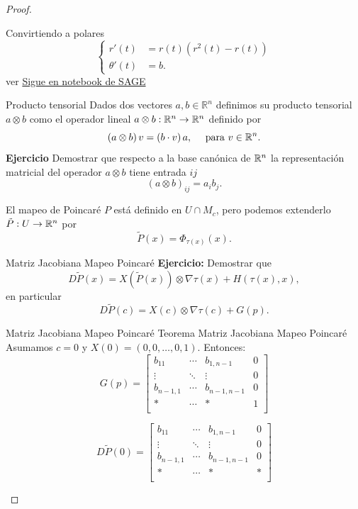 \begin{proof}
\begin{ejemplo}
Convirtiendo a polares
\[
 \begin{cases}
  r'(t)&=r(t)(r^2(t)-r(t))\\
  \theta'(t)&=b.
 \end{cases}
\]
ver \href{http://sage.ccad.unrc.edu.ar/home/pub/63/}{Sigue en notebook de SAGE}


{Producto tensorial}
Dados dos vectores $a,b\in\mathbb{R}^n$ definimos su producto tensorial $a\otimes b$ como el operador lineal  $a\otimes b:\mathbb{R}^n\to\mathbb{R}^n$ definido por
\[\left(a\otimes b\right)v=\left(b\cdot v\right)a,\quad \text{ para } v\in\mathbb{R}^n.\]
\textbf{Ejercicio} Demostrar que respecto a la base canónica de  $\mathbb{R}^n$ la representación matricial del operador $a\otimes b$ tiene entrada $ij$
\[\left(a\otimes b\right)_{ij}=a_ib_j.\]

El mapeo de Poincaré $P$ está definido en $U\cap M_c$, pero podemos extenderlo $\tilde{P}:U\to\mathbb{R}^n$ por
\[\tilde{P}(x)=\Phi_{\tau(x)}(x).\]




{Matriz Jacobiana Mapeo Poincaré}
\textbf{Ejercicio:} Demostrar que
\[D\tilde{P}(x)=X(\tilde{P}(x))\otimes\nabla\tau(x)+H(\tau(x),x),\]
en particular
\[D\tilde{P}(c)=X(c)\otimes\nabla\tau(c)+G(p).\]



{Matriz Jacobiana Mapeo Poincaré}
{Teorema Matriz Jacobiana Mapeo Poincaré}
 Asumamos $c=0$ y $X(0)=(0,0,\ldots,0,1)$. Entonces:
 \begin{equation}\label{gp}G(p)=\begin{bmatrix}
         b_{11}&\cdots&b_{1,n-1}&0\\
        \vdots &\ddots&\vdots&0\\
         b_{n-1,1}&\cdots&b_{n-1,n-1}&0\\
         *&\cdots&*&1\\
        \end{bmatrix}
 \end{equation}
 
 \begin{equation}\label{dptil}D\tilde{P}(0)=\begin{bmatrix}
         b_{11}&\cdots&b_{1,n-1}&0\\
        \vdots &\ddots&\vdots&0\\
         b_{n-1,1}&\cdots&b_{n-1,n-1}&0\\
         *&\cdots&*&*\\
        \end{bmatrix}
\end{equation}







\end{ejemplo}
\end{proof}
